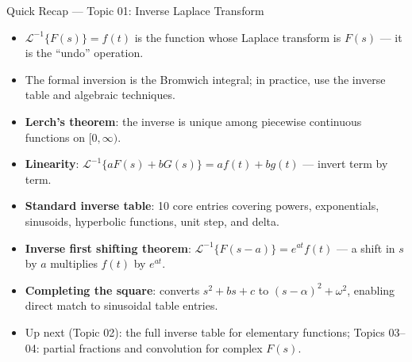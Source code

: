 \documentclass[12pt,a4paper]{article}
\begin{document}
\begin{learnbox}{Quick Recap --- Topic 01: Inverse Laplace Transform}
\begin{itemize}
  \item $\mathcal{L}^{-1}\{F(s)\}=f(t)$ is the function whose Laplace transform
        is $F(s)$ --- it is the ``undo'' operation.
  \item The formal inversion is the Bromwich integral; in practice, use the
        inverse table and algebraic techniques.
  \item \textbf{Lerch's theorem}: the inverse is unique among piecewise
        continuous functions on $[0,\infty)$.
  \item \textbf{Linearity}: $\mathcal{L}^{-1}\{aF(s)+bG(s)\}=af(t)+bg(t)$
        --- invert term by term.
  \item \textbf{Standard inverse table}: 10 core entries covering powers,
        exponentials, sinusoids, hyperbolic functions, unit step, and delta.
  \item \textbf{Inverse first shifting theorem}:
        $\mathcal{L}^{-1}\{F(s-a)\}=e^{at}f(t)$ --- a shift in $s$ by $a$
        multiplies $f(t)$ by $e^{at}$.
  \item \textbf{Completing the square}: converts $s^2+bs+c$ to
        $(s-\alpha)^2+\omega^2$, enabling direct match to sinusoidal table entries.
  \item Up next (Topic 02): the full inverse table for elementary functions;
        Topics 03--04: partial fractions and convolution for complex $F(s)$.
\end{itemize}
\end{learnbox}
\end{document}

